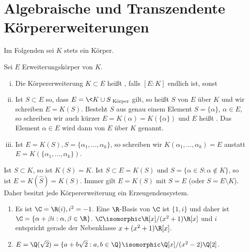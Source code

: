 \section{Algebraische und Transzendente Körpererweiterungen}


Im Folgenden sei $K$ stets ein Körper.

\begin{df} \label{dup:18.3-1}
	Sei $E$ Erweiterungskörper von $K$.
	\begin{enumerate}[i)]
		\item
			Die Körpererweiterung $K \subset E$ heißt , falls $[E : K]$ endlich ist, sonst 
		\item
			Ist $S \subset E$ so, dass $E = \<K \cup S\>_{\text{Körper}}$ gilt, so heißt $S$  von $E$ über $K$ und wir schreiben $E = K(S)$.
			Besteht $S$ aus genau einem Element $S = \{ \alpha \}$, $\alpha \in E$, so schreiben wir auch kürzer $E = K(\alpha) = K(\{\alpha\})$ und $E$ heißt .
			Das Element $\alpha \in E$ wird dann  von $E$ über $K$ genannt.
		\item
			Ist $E = K(S), S = \{\alpha_1, \dotsc, \alpha_k\}$, so schreiben wir $K(\alpha_1, \dotsc, \alpha_k) = E$ anstatt $E = K(\{\alpha_1, \dotsc, \alpha_k\})$.
	\end{enumerate}
\end{df}

\begin{note}
	Ist $S \subset K$, so ist $K(S) = K$.
	Ist $S \subset E = K(S)$ und $\hat S = \{ \alpha \in S : \alpha \not\in K\}$, so ist $E = K(\hat S) = K(S)$.
	Immer gilt $E = K(S)$ mit $S = E$ (oder $S = E \setminus K$).
	Daher besitzt jede Körpererweiterung ein Erzeugendensystem.
\end{note}

\begin{ex*}
	\begin{enumerate}[1.)]
		\item
			Es ist $\C = \R(i), i^2 = -1$.
			Eine $\R$-Basis von $\C$ ist $\{1, i\}$ und daher ist $\C = \{ \alpha + \beta i : \alpha, \beta \in \R\}$.
			$\C \isomorphic \R[x] / (x^2+1) \R[x]$ und $i$ entspricht gerade der Nebenklasse $x + (x^2+1)\R[x]$.
		\item
			$E = \Q(\sqrt 2) = \{ a + b \sqrt 2 : a,b \in \Q \} \isomorphic \Q[x] / (x^2 - 2) \Q[2]$.
	\end{enumerate}
\end{ex*}

